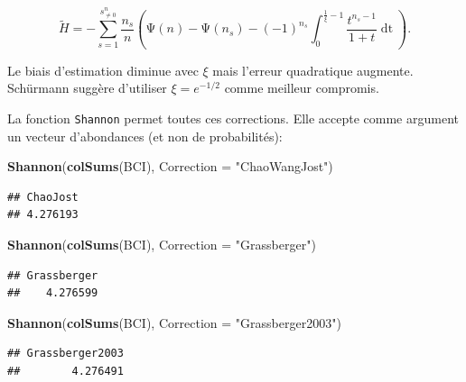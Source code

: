 \documentclass[
  11pt,
  french,
  a4paper,
  extrafontsizes,onecolumn,openright
  ]{memoir}
\newenvironment{Shaded}{\begin{snugshade}}{\end{snugshade}}
\newcommand{\AttributeTok}[1]{\textcolor[rgb]{0.13,0.29,0.53}{#1}}
\newcommand{\FunctionTok}[1]{\textcolor[rgb]{0.13,0.29,0.53}{\textbf{#1}}}
\newcommand{\NormalTok}[1]{#1}
\newcommand{\StringTok}[1]{\textcolor[rgb]{0.31,0.60,0.02}{#1}}
\begin{document}
\begin{equation}
  \label{eq:Schurmann2004}
  \tilde{H} = -\sum^{s^{n}_{\ne 0}}_{s=1}
    {\frac{n_s}{n} \left(\mathrm{\Psi}\left(n\right)-\mathrm{\Psi}\left(n_s\right)-{\left(-1\right)}^{n_s}\int^{\frac{1}{\xi}-1}_0{\frac{t^{n_s-1}}{1+t}\mathop{dt}}\right)}.
\end{equation}

Le biais d'estimation diminue avec \(\xi\) mais l'erreur quadratique augmente.
Schürmann suggère d'utiliser \(\xi=e^{-{1}/{2}}\) comme meilleur compromis.

La fonction \texttt{Shannon} permet toutes ces corrections.
Elle accepte comme argument un vecteur d'abondances (et non de probabilités):

\scriptsize

\begin{Shaded}
\begin{Highlighting}[]
\FunctionTok{Shannon}\NormalTok{(}\FunctionTok{colSums}\NormalTok{(BCI), }\AttributeTok{Correction =} \StringTok{"ChaoWangJost"}\NormalTok{)}
\end{Highlighting}
\end{Shaded}

\begin{verbatim}
## ChaoJost 
## 4.276193
\end{verbatim}

\begin{Shaded}
\begin{Highlighting}[]
\FunctionTok{Shannon}\NormalTok{(}\FunctionTok{colSums}\NormalTok{(BCI), }\AttributeTok{Correction =} \StringTok{"Grassberger"}\NormalTok{)}
\end{Highlighting}
\end{Shaded}

\begin{verbatim}
## Grassberger 
##    4.276599
\end{verbatim}

\begin{Shaded}
\begin{Highlighting}[]
\FunctionTok{Shannon}\NormalTok{(}\FunctionTok{colSums}\NormalTok{(BCI), }\AttributeTok{Correction =} \StringTok{"Grassberger2003"}\NormalTok{)}
\end{Highlighting}
\end{Shaded}

\begin{verbatim}
## Grassberger2003 
##        4.276491
\end{verbatim}
\end{document}
